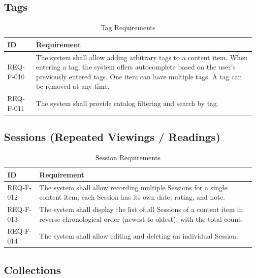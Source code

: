 \subsection{Tags}

\begin{table}[h]
\caption{Tag Requirements}
\label{tab:tehy}
\begin{tabular}{L{2.5cm} L{11.5cm}}
\toprule
\textbf{ID} & \textbf{Requirement} \\
\midrule
REQ-F-010 & The system shall allow adding arbitrary tags to a content item. When entering a tag, the system offers autocomplete based on the user's previously entered tags. One item can have multiple tags. A tag can be removed at any time.  \\
\addlinespace
REQ-F-011 & The system shall provide catalog filtering and search by tag.  \\
\bottomrule
\end{tabular}
\end{table}

\subsection{Sessions (Repeated Viewings / Readings)}

\begin{table}[h]
\caption{Session Requirements}
\label{tab:sessions}
\begin{tabular}{L{2.5cm} L{11.5cm}}
\toprule
\textbf{ID} & \textbf{Requirement} \\
\midrule
REQ-F-012 & The system shall allow recording multiple Sessions for a single content item; each Session has its own date, rating, and note.  \\
\addlinespace
REQ-F-013 & The system shall display the list of all Sessions of a content item in reverse chronological order (newest to oldest), with the total count.  \\
\addlinespace
REQ-F-014 & The system shall allow editing and deleting an individual Session.  \\
\bottomrule
\end{tabular}
\end{table}

\subsection{Collections}

